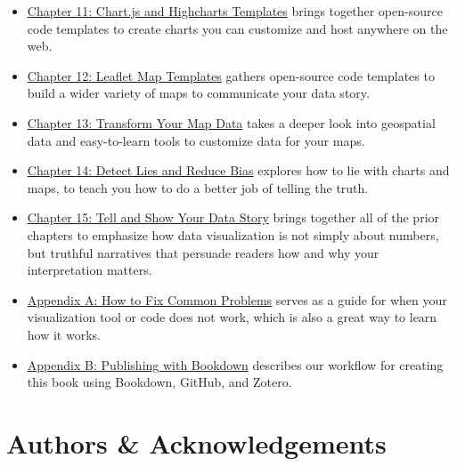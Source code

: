 \documentclass[
  english,
]{book}
\begin{document}
\begin{itemize}
\item
  \href{chartcode.html}{Chapter 11: Chart.js and Highcharts Templates} brings together open-source code templates to create charts you can customize and host anywhere on the web.
\item
  \href{leaflet.html}{Chapter 12: Leaflet Map Templates} gathers open-source code templates to build a wider variety of maps to communicate your data story.
\item
  \href{transform.html}{Chapter 13: Transform Your Map Data} takes a deeper look into geospatial data and easy-to-learn tools to customize data for your maps.
\item
  \href{detect.html}{Chapter 14: Detect Lies and Reduce Bias} explores how to lie with charts and maps, to teach you how to do a better job of telling the truth.
\item
  \href{story.html}{Chapter 15: Tell and Show Your Data Story} brings together all of the prior chapters to emphasize how data visualization is not simply about numbers, but truthful narratives that persuade readers how and why your interpretation matters.
\item
  \href{fix.html}{Appendix A: How to Fix Common Problems} serves as a guide for when your visualization tool or code does not work, which is also a great way to learn how it works.
\item
  \href{bookdown.html}{Appendix B: Publishing with Bookdown} describes our workflow for creating this book using Bookdown, GitHub, and Zotero.
\end{itemize}

\hypertarget{authors}{%
\section*{Authors \& Acknowledgements}\label{authors}}
\end{document}
